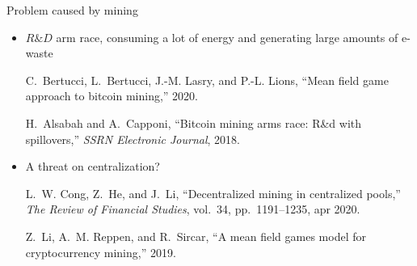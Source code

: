 \documentclass{beamer}
\begin{document}
\begin{frame}{Problem caused by mining}
\begin{itemize}
  \item $R\&D$ arm race, consuming a lot of energy and generating large amounts of e-waste
\tiny
\begin{thebibliography}{1}

C.~Bertucci, L.~Bertucci, J.-M. Lasry, and P.-L. Lions, ``Mean field game
  approach to bitcoin mining,'' 2020.

H.~Alsabah and A.~Capponi, ``Bitcoin mining arms race: R{\&}d with
  spillovers,'' {\em {SSRN} Electronic Journal}, 2018.

\end{thebibliography}
\end{itemize}
\begin{itemize}
  \item \normalsize A threat on centralization?
\tiny
\begin{thebibliography}{1}

L.~W. Cong, Z.~He, and J.~Li, ``Decentralized mining in centralized pools,''
  {\em The Review of Financial Studies}, vol.~34, pp.~1191--1235, apr 2020.

Z.~Li, A.~M. Reppen, and R.~Sircar, ``A mean field games model for
  cryptocurrency mining,'' 2019.

\end{thebibliography}
\end{itemize}
\end{frame}
\end{document}
